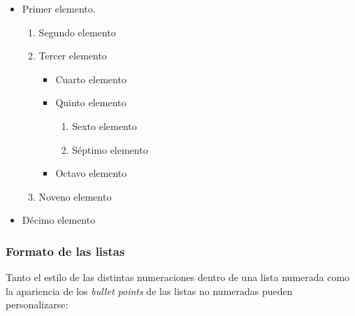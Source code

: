 \begin{itemize}
    \item Primer elemento.
    \begin{enumerate}
        \item Segundo elemento
        \item Tercer elemento
        \begin{itemize}
            \item Cuarto elemento
            \item Quinto elemento
            \begin{enumerate}
                \item Sexto elemento
                \item Séptimo elemento
            \end{enumerate}
            \item Octavo elemento
        \end{itemize}
        \item Noveno elemento
    \end{enumerate}
    \item Décimo elemento
\end{itemize}


\subsubsection{Formato de las listas}

Tanto el estilo de las distintas numeraciones dentro de una lista numerada como la apariencia de los \textit{bullet points} de las listas no numeradas pueden personalizarse:

\renewcommand{\labelenumi}{\Roman{enumi}} %
\renewcommand{\labelenumii}{\Alph{enumii}} %
\renewcommand{\labelitemi}{\textbullet} %
\renewcommand{\labelitemii}{\textasteriskcentered} %


